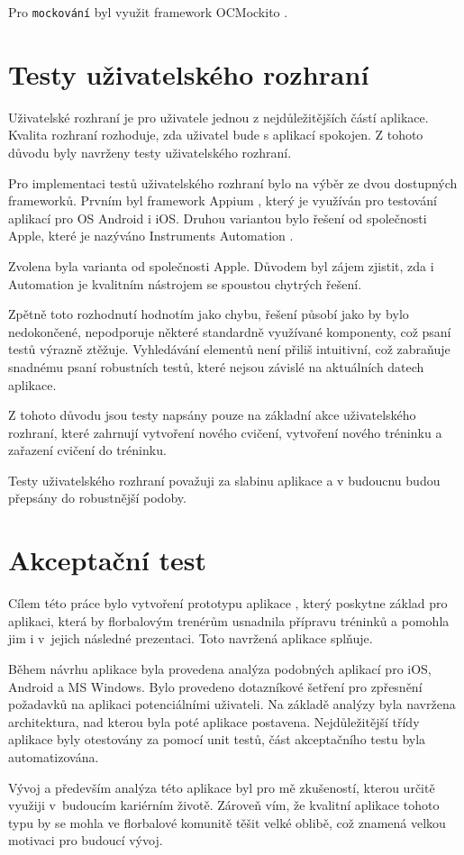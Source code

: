 \documentclass[thesis=B,czech]{FITthesis}[2012/06/26]
\begin{document}
	Pro \texttt{mockování} byl využit framework OCMockito \cite{mockitoOnline}.

\section{Testy uživatelského rozhraní}

	Uživatelské rozhraní je pro uživatele jednou z nejdůležitějších částí aplikace. Kvalita rozhraní rozhoduje, zda uživatel bude s aplikací spokojen. Z tohoto důvodu byly navrženy testy uživatelského rozhraní.

	Pro implementaci testů uživatelského rozhraní bylo na výběr ze dvou dostupných frameworků. Prvním byl framework Appium \cite{appiumOnline}, který je využíván pro testování aplikací pro OS Android i iOS. Druhou variantou bylo řešení od společnosti Apple, které je nazýváno Instruments Automation \cite{automationOnline}.

	Zvolena byla varianta od společnosti Apple. Důvodem byl zájem zjistit, zda i Automation je kvalitním nástrojem se spoustou chytrých řešení.

	Zpětně toto rozhodnutí hodnotím jako chybu, řešení působí jako by bylo nedokončené, nepodporuje některé standardně využívané komponenty, což psaní testů výrazně ztěžuje. Vyhledávání elementů není přiliš intuitivní, což zabraňuje snadnému psaní robustních testů, které nejsou závislé na aktuálních datech aplikace.

	Z tohoto důvodu jsou testy napsány pouze na základní akce uživatelského rozhraní, které zahrnují vytvoření nového cvičení, vytvoření nového tréninku a zařazení cvičení do tréninku.

	Testy uživatelského rozhraní považuji za slabinu aplikace a v budoucnu budou přepsány do robustnější podoby.

\section{Akceptační test}

\begin{conclusion}
	Cílem této práce bylo vytvoření prototypu aplikace , který poskytne základ pro aplikaci, která by florbalovým trenérům usnadnila přípravu tréninků a pomohla jim i v~jejich následné prezentaci. Toto navržená aplikace splňuje.

	Během návrhu aplikace byla provedena analýza podobných aplikací pro iOS, Android a MS Windows. Bylo provedeno dotazníkové šetření pro zpřesnění požadavků na aplikaci potenciálními uživateli. Na základě analýzy byla navržena architektura, nad kterou byla poté aplikace postavena. Nejdůležitější třídy aplikace byly otestovány za pomocí unit testů, část akceptačního testu byla automatizována.

	Vývoj a především analýza této aplikace byl pro mě zkušeností, kterou určitě využiji v~budoucím kariérním životě. Zároveň vím, že kvalitní aplikace tohoto typu by se mohla ve florbalové komunitě těšit velké oblibě, což znamená velkou motivaci pro budoucí vývoj.
\end{conclusion}
\end{document}
